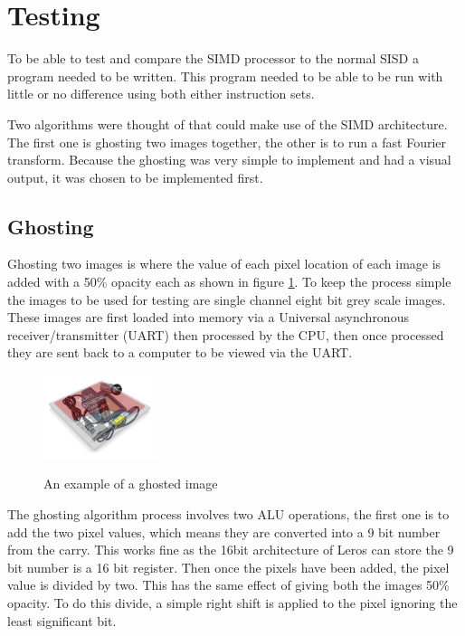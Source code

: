 \section{Testing}

To be able to test and compare the SIMD processor to the normal SISD a program
needed to be written. This program needed to be able to be run with little or no
difference using both either instruction sets.

Two algorithms were thought of that could make use of the SIMD architecture.
The first one is ghosting two images together, the other is to run a fast
Fourier transform. Because the ghosting was very simple to implement and had a
visual output, it was chosen to be implemented first.

\subsection{Ghosting}
  Ghosting two images is where the value of each pixel location of each image is
  added with a 50\% opacity each as shown in figure \ref{ghosting}. To keep the
  process simple the images to be used for testing are single channel eight bit
  grey scale images. These images are first loaded into memory via a Universal
  asynchronous receiver/transmitter (UART) then processed by the CPU,
  then once processed they are sent back to a computer to be viewed via the UART.

  \begin{figure}[h!]
  \caption{An example of a ghosted image}
  \centering
  \includegraphics[width=0.3\textwidth]{images/ghosted}
  \label{ghosting}
  \end{figure}

  The ghosting algorithm process involves two ALU operations, the first one is
  to add the two pixel values, which means they are converted into a 9 bit
  number from the carry. This works fine as the 16bit architecture of Leros can
  store the 9 bit number is a 16 bit register. Then once the pixels have been
  added, the pixel value is divided by two. This has the same effect of giving
  both the images 50\% opacity. To do this divide, a simple right shift is
  applied to the pixel ignoring the least significant bit.

